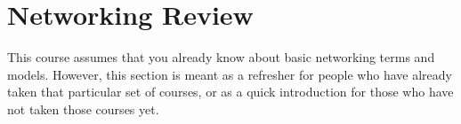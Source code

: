 \section{Networking Review}\label{sec:Networking_Review}
This course assumes that you already know about basic networking terms and models.
However, this section is meant as a refresher for people who have already taken that particular set of courses, or as a quick introduction for those who have not taken those courses yet.













